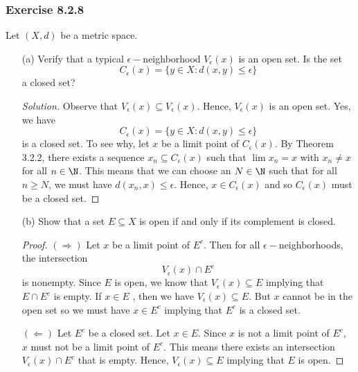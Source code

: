 \subsubsection{Exercise 8.2.8} Let \( (X,d) \) be a metric space.
\begin{enumerate}
    \item[(a)] Verify that a typical \( \epsilon- \)neighborhood \( V_{\epsilon }(x)  \) is an open set. Is the set 
        \[  C_{\epsilon }(x) = \{ y \in X : d(x,y) \leq \epsilon \}  \] a closed set? 
        \begin{proof}[Solution]
        Observe that \( V_{\epsilon }(x) \subseteq V_{\epsilon }(x)  \). Hence, \( V_{\epsilon }(x)  \) is an open set. 
        Yes, we have 
        \[  C_{\epsilon }(x) = \{ y \in X : d(x,y) \leq \epsilon \}  \] is a closed set. To see why, let \( x  \) be a limit point of \( C_{\epsilon }(x)  \). By Theorem 3.2.2, there exists a sequence \( x_{n} \subseteq C_{\epsilon }(x)  \) such that \( \lim x_{n} = x  \) with \( x_{n} \neq x  \) for all \( n \in \N  \). This means that we can choose an \( N \in \N  \) such that for all \( n \geq N  \), we must have \( d(x_{n}, x ) \leq \epsilon  \). Hence, \( x  \in C_{\epsilon }(x)  \) and so \( C_{\epsilon }(x)  \) must be a closed set.
        \end{proof}
    \item[(b)] Show that a set \( E \subseteq X  \) is open if and only if its complement is closed.
        \begin{proof}
        \( (\Rightarrow) \) Let \( x  \) be a limit point of \(E^{c} \). Then for all \( \epsilon- \)neighborhoods, the intersection 
        \[  V_{\epsilon }(x) \cap E^{c} \] is nonempty. Since \( E  \) is open, we know that 
        \( V_{\epsilon }(x) \subseteq E  \) implying that \( E \cap E^{c} \) is empty. If \( x  \in E \) , then we have \( V_{\epsilon }(x) \subseteq E \). But \( x  \) cannot be in the open set so we must have \( x \in E^{c} \) implying that \( E^{c}  \) is a closed set.
       
        \( (\Leftarrow )\) Let \( E^{c} \) be a closed set. Let \( x \in E  \). Since \( x   \) is not a limit point of \( E^{c} \), \( x  \) must not be a limit point of \( E^{c} \). This means there exists an intersection \( V_{\epsilon }(x) \cap E^{c}  \)  that is empty. Hence, \( V_{\epsilon }(x) \subseteq E   \) implying that \( E  \) is open.
        \end{proof}
\end{enumerate}





